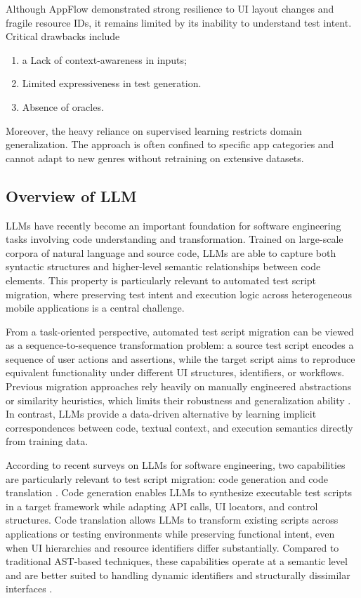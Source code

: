 \documentclass[acmsmall,nonacm]{acmart}
\begin{document}
\begin{itemize}
    Although AppFlow demonstrated strong resilience to UI layout changes and fragile resource IDs, it remains limited by its inability to understand test intent. Critical drawbacks include \cite{8952228} \begin{enumerate}\item a Lack of context-awareness in inputs; \item Limited expressiveness in test generation. \item Absence of oracles. \end{enumerate} Moreover, the heavy reliance on supervised learning restricts domain generalization. The approach is often confined to specific app categories and cannot adapt to new genres without retraining on extensive datasets.
    \end{itemize}

\subsection{Overview of LLM}
LLMs have recently become an important foundation for software engineering tasks involving code understanding and transformation. Trained on large-scale corpora of natural language and source code, LLMs are able to capture both syntactic structures and higher-level semantic relationships between code elements\cite{zhang2024surveylargelanguagemodels}. This property is particularly relevant to automated test script migration, where preserving test intent and execution logic across heterogeneous mobile applications is a central challenge.

From a task-oriented perspective, automated test script migration can be viewed as a sequence-to-sequence transformation problem: a source test script encodes a sequence of user actions and assertions, while the target script aims to reproduce equivalent functionality under different UI structures, identifiers, or workflows. Previous migration approaches rely heavily on manually engineered abstractions or similarity heuristics, which limits their robustness and generalization ability \cite{10.1145/3236024.3236055,8952228}. In contrast, LLMs provide a data-driven alternative by learning implicit correspondences between code, textual context, and execution semantics directly from training data.

According to recent surveys on LLMs for software engineering, two capabilities are particularly relevant to test script migration: code generation and code translation \cite{zhang2024surveylargelanguagemodels}. Code generation enables LLMs to synthesize executable test scripts in a target framework while adapting API calls, UI locators, and control structures. Code translation allows LLMs to transform existing scripts across applications or testing environments while preserving functional intent, even when UI hierarchies and resource identifiers differ substantially. Compared to traditional AST-based techniques, these capabilities operate at a semantic level and are better suited to handling dynamic identifiers and structurally dissimilar interfaces \cite{zhang2024surveylargelanguagemodels}.
\end{document}
